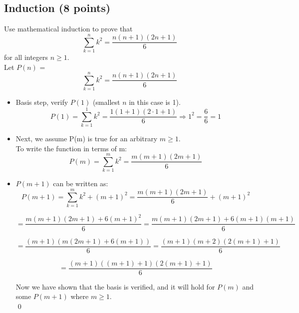 \documentclass[12pt]{article}
\begin{document}
\subsection{Induction (8 points)}
\label{sec:induction}

Use mathematical induction to prove that
  $$\sum_{k=1}^n k^2 = \frac{n(n+1)(2n+1)}{6}$$
for all integers $n\geq 1$.   \\

Let $P(n)$ =   $$\sum_{k=1}^n k^2 = \frac{n(n+1)(2n+1)}{6}$$ 


\begin{itemize}
\item Basis step, verify $P(1)$ (smallest $n$ in this case is 1).
  $$
  P(1) = \sum_{k=1}^1 k^2 = \frac{1(1+1)(2\cdot 1+1)}{6} \Rightarrow 1^2 = \frac{6}{6} = 1
  $$
\item Next, we assume P(m) is true for an arbitrary $m \geq 1$. \\
  To write the function in terms of m: \\

  $$P(m) = \sum_{k=1}^m k^2 = \frac{m(m+1)(2m+1)}{6}$$

\item $P(m+1)$ can be written as: \\

  $$
  P(m+1) = \sum_{k=1}^m k^2 + (m+1)^2 = \frac{m(m+1)(2m+1)}{6} + (m+1)^2
  $$

  $$
  = \frac{m(m+1)(2m+1)+6(m+1)^2}{6} = \frac{m(m+1)(2m+1)+6(m+1)(m+1)}{6}
  $$

  $$
  = \frac{(m+1)(m(2m+1)+6(m+1))}{6} = \frac{(m+1)(m+2)(2(m+1)+1)}{6} 
  $$

  $$
  = \frac{(m+1)((m+1)+1)(2(m+1)+1)}{6}
  $$

  Now we have shown that the basis is verified, and it will hold for $P(m)$ and some $P(m+1)$ where $m \geq 1$.\\
  \qed
  
\end{itemize}
\end{document}
